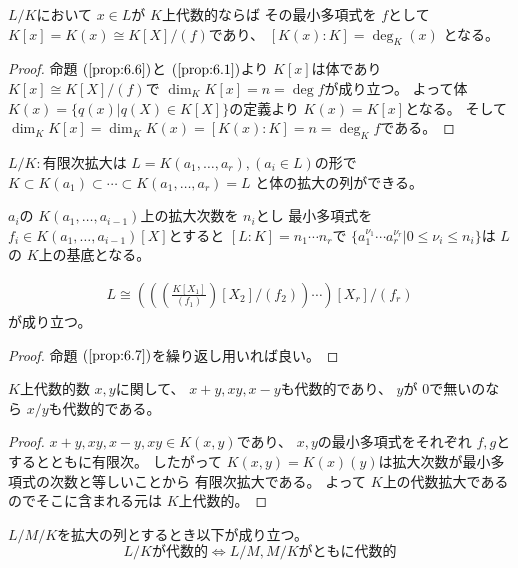 \documentclass[../master_galois_theory]{subfiles}
\begin{document}
\begin{prop} \label{prop:6.7}
  $L/K$において $x \in L$が $K$上代数的ならば
  その最小多項式を $f$として
  $K[x] = K(x) \cong K[X]/(f)$であり、
  $[K(x):K] = \deg_K (x)$
  となる。
\end{prop}

\begin{proof}
  命題 $(\mathrm{\ref{prop:6.6}})$と $(\mathrm{\ref{prop:6.1}})$より
  $K[x]$は体であり
  $K[x] \cong K[X]/(f)$で $\dim_K K[x] = n = \deg f$が成り立つ。
  よって体 $K(x) = \{ q(x) | q(X) \in K[X] \}$の定義より
  $K(x) = K[x]$となる。
  そして $\dim_K K[x] = \dim_K K(x) = [K(x):K] = n = \deg_K f$である。
\end{proof}

\begin{corl} \label{corl:6.8}
  $L/K:$有限次拡大は
  $L = K(a_1 , \dots , a_r) , (a_i \in L)$の形で
  $K \subset K(a_1) \subset \cdots \subset K(a_1 , \dots , a_r) = L$
  と体の拡大の列ができる。

  $a_i$の $K(a_1 , \dots , a_{i-1})$上の拡大次数を $n_i$とし
  最小多項式を $f_i \in K(a_1 , \dots , a_{i-1})[X]$とすると
  $[L:K] = n_1 \cdots n_r$で
  $\{ a_1^{\nu_1} \cdots a_r^{\nu_r} | 0 \leq \nu_i \leq n_i \}$は
  $L$の $K$上の基底となる。

  \begin{eqnarray*}
    L \cong \left( \left( \left( \frac{K[X_1]}{(f_1)} \right) [X_2]/(f_2) \right) \cdots \right) [X_r]/(f_r)
  \end{eqnarray*}
  が成り立つ。
\end{corl}

\begin{proof}
  命題 $(\mathrm{\ref{prop:6.7}})$を繰り返し用いれば良い。
\end{proof}

\begin{lemm} \label{lemm:daisuuwa}
  $K$上代数的数 $x , y$に関して、 $x + y , xy , x - y$も代数的であり、
  $y$が $0$で無いのなら $x/y$も代数的である。
\end{lemm}

\begin{proof}
  $x + y , xy , x - y , xy \in K(x,y)$であり、
  $x,y$の最小多項式をそれぞれ $f , g$とするとともに有限次。
  したがって $K(x,y) = K(x)(y)$は拡大次数が最小多項式の次数と等しいことから
  有限次拡大である。
  よって $K$上の代数拡大であるのでそこに含まれる元は $K$上代数的。
\end{proof}

\begin{prop} \label{prop:6.9}
  $L/M/K$を拡大の列とするとき以下が成り立つ。
  \[
  L/Kが代数的 \Leftrightarrow L/M , M/Kがともに代数的
  \]
\end{prop}
\end{document}
